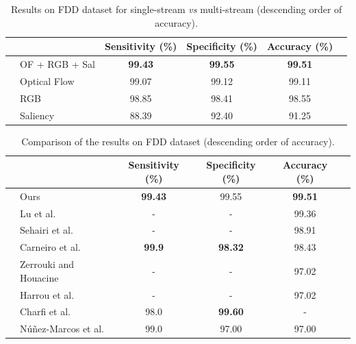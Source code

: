 \documentclass[conference]{IEEEtran}
\begin{document}
\begin{table}[]
\centering
\caption{Results on FDD dataset for single-stream \textit{vs} multi-stream (descending order of accuracy).}
\label{tab:fdd-ensem}
\begin{tabular}{llcccl}
\hline
 &  & Sensitivity (\%) & Specificity (\%) & Accuracy (\%) &  \\ \hline
 & OF + RGB + Sal & \textbf{99.43} & \textbf{99.55} & \textbf{99.51} &  \\
 & Optical Flow & 99.07             & 99.12             & 99.11             &  \\
 & RGB & 98.85             & 98.41             & 98.55             &  \\
 & Saliency & 88.39             & 92.40             & 91.25             & \\ \hline
\end{tabular}
\end{table}
\begin{table}[]
\centering
\caption{Comparison of the results on FDD dataset (descending order of accuracy).}
\label{tab:fdd-our-their}
\begin{tabular}{llcccl}
\hline
 &                                                      & Sensitivity (\%)  & Specificity (\%)  & Accuracy (\%)     & \\ \hline
 & Ours                                                 & \textbf{99.43}    & 99.55             & \textbf{99.51}    & \\
 & Lu et al.~\cite{lu2018deep}                          & -                 & -                 & 99.36             & \\
 & Sehairi et al.~\cite{sehairi2018elderly}             & -                 & -                 & 98.91             & \\
 & Carneiro et al.~\cite{carneiro2019multi}                                                 & \textbf{99.9}      & \textbf{98.32}    & 98.43             & \\
 & Zerrouki and Houacine~\cite{zerrouki2018combined}    & -                 & -                 & 97.02             & \\
 & Harrou et al.~\cite{harrou2017vision}                & -                 & -                 & 97.02             & \\
 & Charfi et al.~\cite{charfi2012definition}            & 98.0              & \textbf{99.60}    & -                 & \\
 & N\'u\~nez-Marcos et al.~\cite{nunez2017vision}       & 99.0              & 97.00             & 97.00             & \\ \hline
\end{tabular}
\end{table}
 
\end{document}
